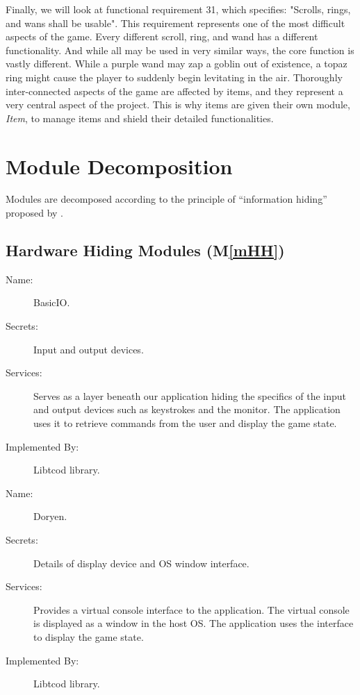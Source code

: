 \documentclass[12pt, titlepage]{article}
\newcommand{\newSection}[1]{
  \newpage
  \section{#1}
}
\newcommand{\mref}[1]{M\ref{#1}}
\begin{document}
    Finally, we will look at functional requirement 31, which specifies: "Scrolls, rings, and wans shall be usable". This requirement represents one of the most difficult aspects of the game. Every different scroll, ring, and wand has a different functionality. And while all may be used in very similar ways, the core function is vastly different. While a purple wand may zap a goblin out of existence, a topaz ring might cause the player to suddenly begin levitating in the air. Thoroughly inter-connected aspects of the game are affected by items, and they represent a very central aspect of the project. This is why items are given their own module, \textit{Item}, to manage items and shield their detailed functionalities.\\



\newSection{Module Decomposition} \label{SecMD}

    Modules are decomposed according to the principle of ``information hiding'' proposed by \citet{ParnasEtAl1984}.

    \subsection{Hardware Hiding Modules (\mref{mHH})}

        \bigskip\begin{description}
            \item[Name:]BasicIO.
            \item[Secrets:]Input and output devices.
            \item[Services:]Serves as a layer beneath our application hiding the specifics of the
            input and output devices such as keystrokes and the monitor. The application uses it
            to retrieve commands from the user and display the game state.
            \item[Implemented By:]Libtcod library.
        \end{description}

        \bigskip\begin{description}
            \item[Name:]Doryen.
            \item[Secrets:]Details of display device and OS window interface.
            \item[Services:]Provides a virtual console interface to the application. The virtual console is displayed as a window in            the host OS. The application uses the interface to display the game state.
            \item[Implemented By:]Libtcod library.
        \end{description}
\end{document}
